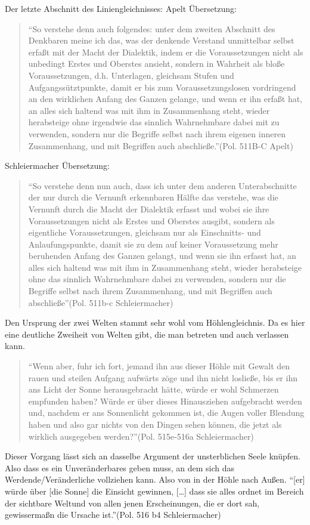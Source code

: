 \documentclass[12pt]{article}
\newcommand*{\zitatblock}[1]{%
    \begin{quote}
    \fontsize{10}{12}\selectfont
    \setlength{\parskip}{1.0em}
    #1
    \end{quote}
}
\begin{document}
Der letzte Abschnitt des Liniengleichnisses: 
Apelt Übersetzung: \zitatblock{\enquote{So verstehe denn auch folgendes: unter dem zweiten Abschnitt des Denkbaren meine ich das, was der denkende Verstand unmittelbar selbst erfaßt mit der Macht der Dialektik, indem er die Voraussetzungen nicht als unbedingt Erstes und Oberstes ansieht, sondern in Wahrheit als bloße Voraussetzungen, d.h. Unterlagen, gleichsam Stufen und Aufgangssütztpunkte, damit er bis zum Voraussetzungslosen vordringend an den wirklichen Anfang des Ganzen gelange, und wenn er ihn erfaßt hat, an alles sich haltend was mit ihm in Zusammenhang steht, wieder herabsteige ohne irgendwie das sinnlich Wahrnehmbare dabei mit zu verwenden, sondern nur die Begriffe selbst nach ihrem eigenen inneren Zusammenhang, und mit Begriffen auch abschließe.}(Pol. 511B-C Apelt)}\nocite{PoliteiaApelt}
Schleiermacher Übersetzung:\zitatblock{\enquote{So verstehe denn nun auch, dass ich unter dem anderen Unterabschnitte der nur durch die Vernunft erkennbaren Hälfte das verstehe, was die Vernunft durch die Macht der Dialektik erfasst und wobei sie ihre Voraussetzungen nicht als Erstes und Oberstes ausgibt, sondern als eigentliche Voraussetzungen, gleichsam nur als Einschnitts- und Anlaufungspunkte, damit sie zu dem auf keiner Voraussetzung mehr beruhenden Anfang des Ganzen gelangt, und wenn sie ihn erfasst hat, an alles sich haltend was mit ihm in Zusammenhang steht, wieder herabsteige ohne das sinnlich Wahrnehmbare dabei zu verwenden, sondern nur die Begriffe selbst nach ihrem Zusammenhang, und mit Begriffen auch abschließe}(Pol. 511b-c Schleiermacher)}
Den Ursprung der zwei Welten stammt sehr wohl vom Höhlengleichnis. Da es hier eine deutliche Zweiheit von Welten gibt, die man betreten und auch verlassen kann.
\zitatblock{\enquote{Wenn aber, fuhr ich fort, jemand ihn aus dieser Höhle mit Gewalt den rauen und steilen Aufgang aufwärts zöge und ihn nicht losließe, bis er ihn ans Licht der Sonne herausgebracht hätte, würde er wohl Schmerzen empfunden haben? Würde er über dieses Hinausziehen aufgebracht werden und, nachdem er ans Sonnenlicht gekommen ist, die Augen voller Blendung haben und also gar nichts von den Dingen sehen können, die jetzt als wirklich ausgegeben werden?}(Pol. 515e-516a Schleiermacher)}
Dieser Vorgang lässt sich an dasselbe Argument der unsterblichen Seele knüpfen. Also dass es ein Unveränderbares geben muss, an dem sich das Werdende/Veränderliche vollziehen kann. Also von in der Höhle nach Außen.
\enquote{[er] würde über [die Sonne] die Einsicht gewinnen, [\dots] dass sie alles ordnet im Bereich der sichtbare Weltund von allen jenen Erscheinungen, die er dort sah, gewissermaßn die Ursache ist.}(Pol. 516 b4 Schleiermacher)
\end{document}
